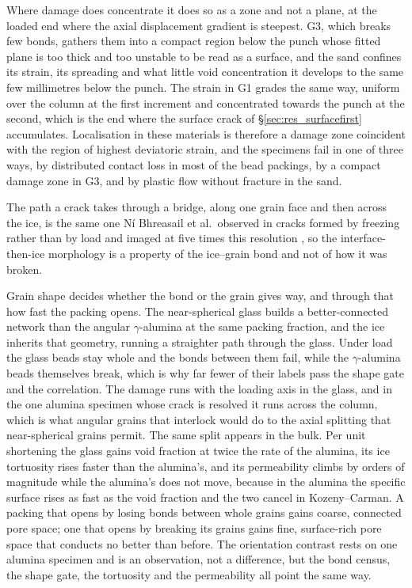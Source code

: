 \documentclass[preprint,12pt,numbers]{elsarticle}
\begin{document}
  Where damage does concentrate it does so as a zone and not a plane, at the
  loaded end where the axial displacement gradient is steepest.  G3, which
  breaks few bonds, gathers them into a compact region below the punch whose
  fitted plane is too thick and too unstable to be read as a surface, and the
  sand confines its strain, its spreading and what little void concentration
  it develops to the same few millimetres below the punch.  The strain in G1
  grades the same way, uniform over the column at the first increment and
  concentrated towards the punch at the second, which is the end where the
  surface crack of \S\ref{sec:res_surfacefirst} accumulates.  Localisation in
  these materials is therefore a damage zone coincident with the region of
  highest deviatoric strain, and the specimens fail in one of three ways, by
  distributed contact loss in most of the bead packings, by a compact damage
  zone in G3, and by plastic flow without fracture in the sand.

  The path a crack takes through a bridge, along one grain face and then
  across the ice, is the same one Ní Bhreasail et al.\ observed in cracks
  formed by freezing rather than by load and imaged at five times this
  resolution \cite{NiBhreasail2012}, so the interface-then-ice morphology is
  a property of the ice--grain bond and not of how it was broken.

  Grain shape decides whether the bond or the grain gives way, and through
  that how fast the packing opens.  The near-spherical glass builds a
  better-connected network than the angular $\gamma$-alumina at the same
  packing fraction, and the ice inherits that geometry, running a straighter
  path through the glass.  Under load the glass beads stay whole and the bonds
  between them fail, while the $\gamma$-alumina beads themselves break, which
  is why far fewer of their labels pass the shape gate and the correlation.
  The damage runs with the loading axis in the glass, and in the one alumina
  specimen whose crack is resolved it runs across the column, which is what
  angular grains that interlock would do to the axial splitting that
  near-spherical grains permit.  The same split appears in the bulk.  Per unit
  shortening the glass gains void fraction at twice the rate of the alumina,
  its ice tortuosity rises faster than the alumina's, and its
  permeability climbs by orders of magnitude while the alumina's does not
  move, because in the alumina the specific surface rises as fast as the void
  fraction and the two cancel in Kozeny--Carman.  A packing that opens by
  losing bonds between whole grains gains coarse, connected pore space; one
  that opens by breaking its grains gains fine, surface-rich pore space that
  conducts no better than before.  The orientation contrast rests on one
  alumina specimen and is an observation, not a difference, but the bond
  census, the shape gate, the tortuosity and the permeability all point the
  same way.
\end{document}
